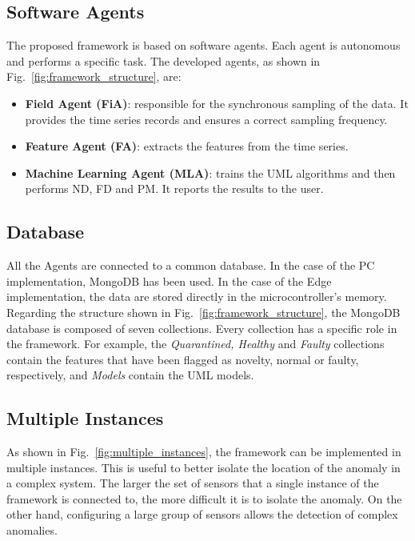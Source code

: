 \subsection{Software Agents}
The proposed framework is based on software agents. Each agent is autonomous and performs a specific task. The developed agents, as shown in Fig.~\ref{fig:framework_structure}, are:
\begin{itemize}
    \item \textbf{Field Agent (FiA)}: responsible for the synchronous sampling of the data. It provides the time series records and ensures a correct sampling frequency.
    \item \textbf{Feature Agent (FA)}: extracts the features from the time series.
    \item \textbf{Machine Learning Agent (MLA)}: trains the UML algorithms and then performs ND, FD and PM. It reports the results to the user.
\end{itemize}

\subsection{Database}
All the Agents are connected to a common database. In the case of the PC implementation, MongoDB has been used. In the case of the Edge implementation, the data are stored directly in the microcontroller's memory.
Regarding the structure shown in Fig.~\ref{fig:framework_structure}, the MongoDB database is composed of seven collections. Every collection has a specific role in the framework. For example, the \emph{Quarantined, Healthy} and \emph{Faulty} collections contain the features that have been flagged as novelty, normal or faulty, respectively, and \emph{Models} contain the UML models.

\subsection{Multiple Instances}
As shown in Fig.~\ref{fig:multiple_instances}, the framework can be implemented in multiple instances. This is useful to better isolate the location of the anomaly in a complex system. The larger the set of sensors that a single instance of the framework is connected to, the more difficult it is to isolate the anomaly. On the other hand, configuring a large group of sensors allows the detection of complex anomalies.

